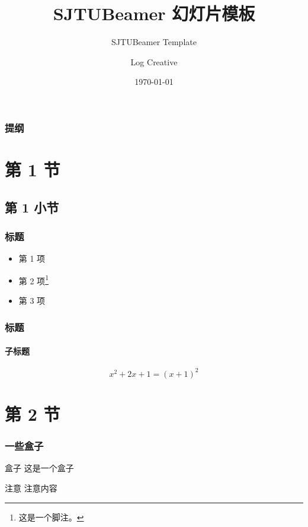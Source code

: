 \documentclass[
]{beamer}
\title{\textsf{SJTUBeamer} 幻灯片模板}  %
\subtitle{SJTUBeamer Template}         %
\author{Log Creative}                  %
\institute[]{github.com/LogCreative}   %
\date{\today}                          %
\begin{document}
\begin{CJK}{UTF8}{hei}

    \maketitle                         %

    \begin{frame}
        \frametitle{提纲}
        \tableofcontents               %
    \end{frame}

    \section{第 1 节}
    \subsection{第 1 小节}
    \begin{frame}
        \frametitle{标题}

        \begin{itemize}
            \item 第 1 项
            \item 第 2 项\footnote{这是一个脚注。}
            \item 第 3 项
        \end{itemize}

    \end{frame}

    \begin{frame}
        \frametitle{标题}
        \framesubtitle{子标题}

        \begin{equation}
            x^2+2x+1=(x+1)^2
        \end{equation}
        
    \end{frame}

    \section{第 2 节}
    \begin{frame}
        \frametitle{一些盒子}
        
        \begin{block}{盒子}
            这是一个盒子
        \end{block}

        \begin{alertblock}{注意}
            注意内容
        \end{alertblock}


\end{frame}
\end{CJK}
\end{document}

